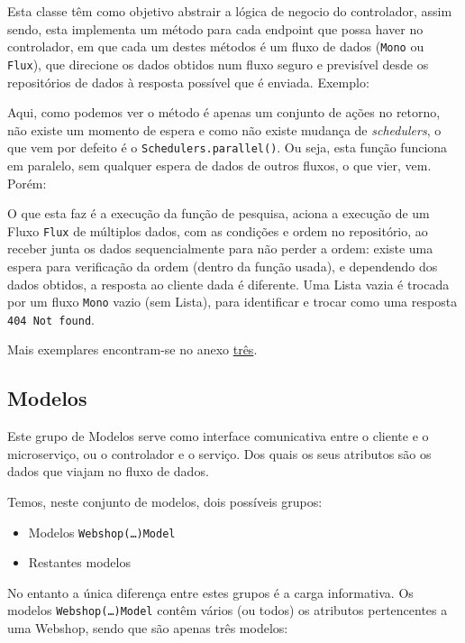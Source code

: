Esta classe têm como objetivo abstrair a lógica de negocio do controlador, assim sendo, esta implementa um método para cada endpoint que possa haver no controlador, em que cada um destes métodos é um fluxo de dados (\texttt{Mono} ou \texttt{Flux}), que direcione os dados obtidos num fluxo seguro e previsível desde os repositórios de dados à resposta possível que é enviada. Exemplo:



Aqui, como podemos ver o método é apenas um conjunto de ações no retorno, não existe um momento de espera e como não existe mudança de \textit{schedulers}, o que vem por defeito é o \texttt{Schedulers.parallel()}. Ou seja, esta função funciona em paralelo, sem qualquer espera de dados de outros fluxos, o que vier, vem. Porém:

O que esta faz é a execução da função de pesquisa, aciona a execução de um Fluxo \texttt{Flux} de múltiplos dados, com as condições e ordem no repositório, ao receber junta os dados sequencialmente para não perder a ordem: existe uma espera para verificação da ordem (dentro da função usada), e dependendo dos dados obtidos, a resposta ao cliente dada é diferente. Uma Lista vazia é trocada por um fluxo \texttt{Mono} vazio (sem Lista), para identificar e trocar como uma resposta \texttt{404 Not found}.

Mais exemplares encontram-se no anexo \hyperref[an3]{três}.

\newpage

\subsection{Modelos}

Este grupo de Modelos serve como interface comunicativa entre o cliente e o microserviço, ou o controlador e o serviço. Dos quais os seus atributos são os dados que viajam no fluxo de dados.

Temos, neste conjunto de modelos, dois possíveis grupos:

\begin{itemize}
  \item {Modelos \texttt{Webshop(\ldots)Model}}
  \item {Restantes modelos}
\end{itemize}

No entanto a única diferença entre estes grupos é a carga informativa. Os modelos \texttt{Webshop(\dots)Model} contêm vários (ou todos) os atributos pertencentes a uma Webshop, sendo que são apenas três modelos:

